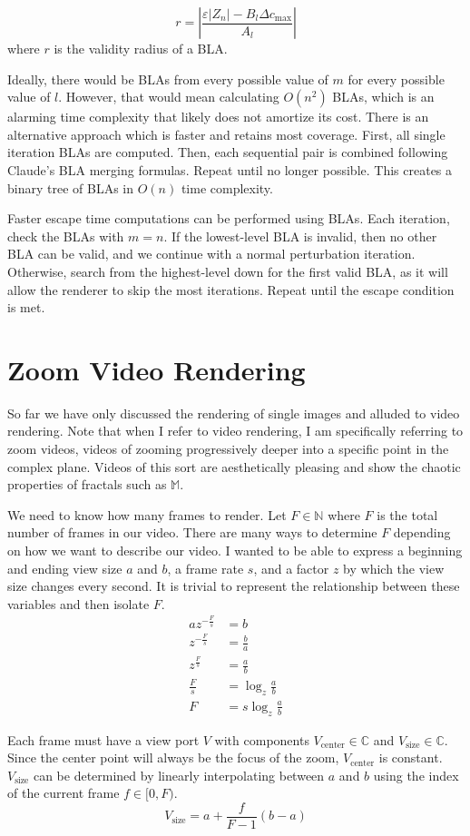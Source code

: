 \documentclass{article}
\begin{document}
\[
    r=\left|\frac{\varepsilon|Z_n| - B_l\Delta c_\text{max}}{A_l}\right|
\]
where $r$ is the validity radius of a BLA.
\par Ideally, there would be BLAs from every possible value of $m$ for every possible value of $l$. However, that would mean calculating $O(n^2)$ BLAs, which is an alarming time complexity that likely does not amortize its cost. There is an alternative approach which is faster and retains most coverage. First, all single iteration BLAs are computed. Then, each sequential pair is combined following Claude's BLA merging formulas\cite{Allen_2024}. Repeat until no longer possible. This creates a binary tree of BLAs in $O(n)$ time complexity. 
\par Faster escape time computations can be performed using BLAs. Each iteration, check the BLAs with $m=n$. If the lowest-level BLA is invalid, then no other BLA can be valid, and we continue with a normal perturbation iteration. Otherwise, search from the highest-level down for the first valid BLA, as it will allow the renderer to skip the most iterations. Repeat until the escape condition is met\cite{Thompson_2023}.
\section{Zoom Video Rendering}
\par So far we have only discussed the rendering of single images and alluded to video rendering. Note that when I refer to video rendering, I am specifically referring to zoom videos, videos of zooming progressively deeper into a specific point in the complex plane. Videos of this sort are aesthetically pleasing and show the chaotic properties of fractals such as $\mathbb{M}$.
\par We need to know how many frames to render. Let $F\in\mathbb{N}$ where $F$ is the total number of frames in our video. There are many ways to determine $F$ depending on how we want to describe our video. I wanted to be able to express a beginning and ending view size $a$ and $b$, a frame rate $s$, and a factor $z$ by which the view size changes every second. It is trivial to represent the relationship between these variables and then isolate $F$.
\[
\begin{aligned}
    az^{-\frac{F}{s}} &= b \\
    z^{-\frac{F}{s}} &= \frac{b}{a} \\
    z^{\frac{F}{s}} &= \frac{a}{b} \\
    \frac{F}{s} &= \log_z \frac{a}{b} \\
    F &= s\log_z \frac{a}{b}
\end{aligned}
\]
\par Each frame must have a view port $V$ with components $V_{\textrm{center}}\in \mathbb{C}$ and $V_{\textrm{size}}\in \mathbb{C}$. Since the center point will always be the focus of the zoom, $V_{\textrm{center}}$ is constant. $V_{\textrm{size}}$ can be determined by linearly interpolating between $a$ and $b$ using the index of the current frame $f\in[0, F)$.
\[ V_\text{size} = a + \frac{f}{F - 1}(b - a) \]
\end{document}
